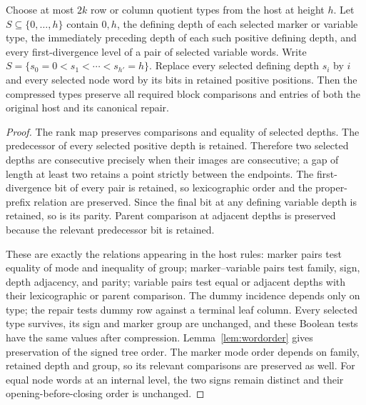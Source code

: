 \begin{lemma}\label{lem:retention}
Choose at most $2k$ row or column quotient types from the host at
height $h$. Let $S\subseteq\{0,\dots,h\}$ contain $0,h$, the
defining depth of each selected marker or variable type, the
immediately preceding depth of each such positive defining depth,
and every first-divergence level of a pair of selected variable
words. Write $S=\{s_0=0<s_1<\cdots<s_{h'}=h\}$. Replace every
selected defining depth $s_i$ by $i$ and every selected node word
by its bits in retained positive positions. Then the compressed
types preserve all required block comparisons and entries of both
the original host and its canonical repair.
\end{lemma}
\begin{proof}
The rank map preserves comparisons and equality of selected depths.
The predecessor of every selected positive depth is retained.
Therefore two selected depths are consecutive precisely when their
images are consecutive; a gap of length at least two retains a point
strictly between the endpoints. The first-divergence bit of every
pair is retained, so lexicographic order and the proper-prefix
relation are preserved. Since the final bit at any defining variable
depth is retained, so is its parity. Parent comparison at adjacent
depths is preserved because the relevant predecessor bit is retained.

These are exactly the relations appearing in the host rules:
marker pairs test equality of mode and inequality of group;
marker--variable pairs test family, sign, depth adjacency, and
parity; variable pairs test equal or adjacent depths with their
lexicographic or parent comparison. The dummy incidence depends
only on type; the repair tests dummy row against a terminal leaf
column. Every selected type survives, its sign and marker group are
unchanged, and these Boolean tests have the same values after
compression. Lemma~\ref{lem:wordorder} gives preservation of the
signed tree order. The marker mode order depends on family, retained
depth and group, so its relevant comparisons are preserved as well.
For equal node words at an internal level, the two signs remain
distinct and their opening-before-closing order is unchanged.
\end{proof}

